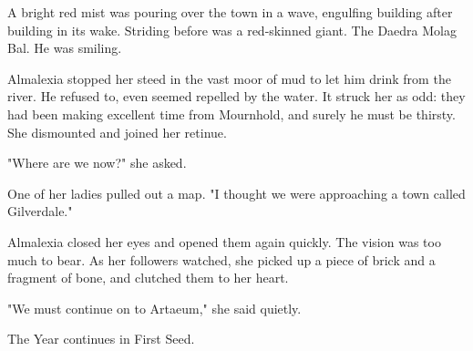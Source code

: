 A bright red mist was pouring over the town in a wave, engulfing building after building in its wake. Striding before was a red-skinned giant. The Daedra Molag Bal. He was smiling.

Almalexia stopped her steed in the vast moor of mud to let him drink from the river. He refused to, even seemed repelled by the water. It struck her as odd: they had been making excellent time from Mournhold, and surely he must be thirsty. She dismounted and joined her retinue.

"Where are we now?" she asked.

One of her ladies pulled out a map. "I thought we were approaching a town called Gilverdale."

Almalexia closed her eyes and opened them again quickly. The vision was too much to bear. As her followers watched, she picked up a piece of brick and a fragment of bone, and clutched them to her heart.

"We must continue on to Artaeum," she said quietly.

The Year continues in First Seed.